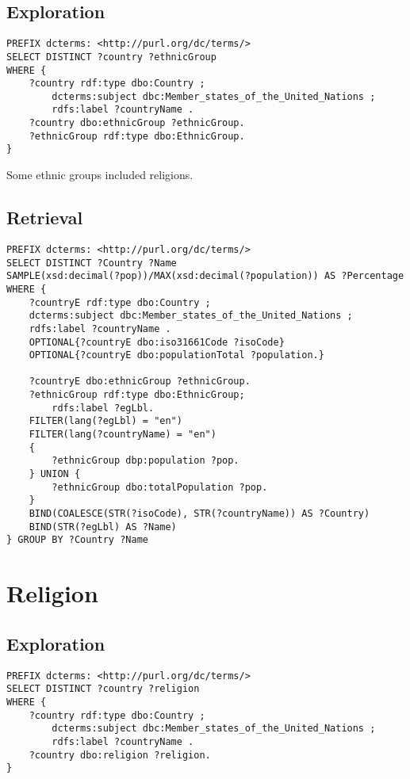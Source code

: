 \documentclass[11pt]{article}
\begin{document}
\subsection{Exploration}
{\footnotesize\begin{verbatim}
PREFIX dcterms: <http://purl.org/dc/terms/>
SELECT DISTINCT ?country ?ethnicGroup
WHERE {
    ?country rdf:type dbo:Country ;
        dcterms:subject dbc:Member_states_of_the_United_Nations ;
        rdfs:label ?countryName .
    ?country dbo:ethnicGroup ?ethnicGroup.
    ?ethnicGroup rdf:type dbo:EthnicGroup.
}
\end{verbatim}}
Some ethnic groups included religions.

\subsection{Retrieval}
{\footnotesize\begin{verbatim}
PREFIX dcterms: <http://purl.org/dc/terms/>
SELECT DISTINCT ?Country ?Name
SAMPLE(xsd:decimal(?pop))/MAX(xsd:decimal(?population)) AS ?Percentage
WHERE {
    ?countryE rdf:type dbo:Country ;
    dcterms:subject dbc:Member_states_of_the_United_Nations ;
    rdfs:label ?countryName .
    OPTIONAL{?countryE dbo:iso31661Code ?isoCode}
    OPTIONAL{?countryE dbo:populationTotal ?population.}

    ?countryE dbo:ethnicGroup ?ethnicGroup.
    ?ethnicGroup rdf:type dbo:EthnicGroup;
        rdfs:label ?egLbl.
    FILTER(lang(?egLbl) = "en")
    FILTER(lang(?countryName) = "en")
    {
        ?ethnicGroup dbp:population ?pop.
    } UNION {
        ?ethnicGroup dbo:totalPopulation ?pop.
    }
    BIND(COALESCE(STR(?isoCode), STR(?countryName)) AS ?Country)
    BIND(STR(?egLbl) AS ?Name)
} GROUP BY ?Country ?Name
\end{verbatim}}

\section{Religion}
\subsection{Exploration}
{\footnotesize\begin{verbatim}
PREFIX dcterms: <http://purl.org/dc/terms/>
SELECT DISTINCT ?country ?religion
WHERE {
    ?country rdf:type dbo:Country ;
        dcterms:subject dbc:Member_states_of_the_United_Nations ;
        rdfs:label ?countryName .
    ?country dbo:religion ?religion.
}
\end{verbatim}}
\end{document}
